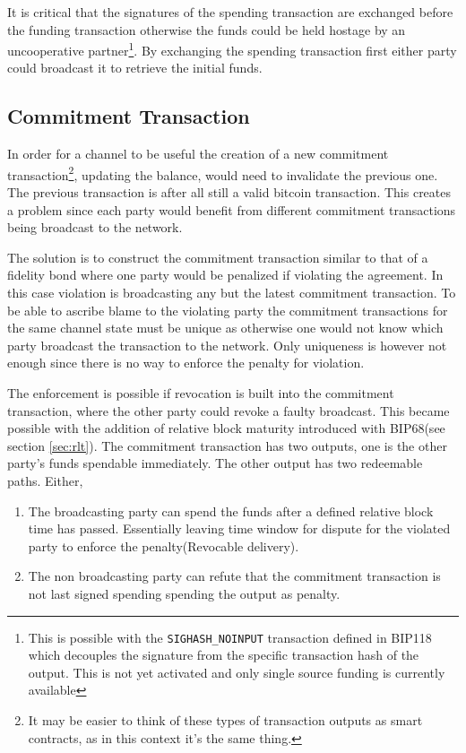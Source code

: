 It is critical that the signatures of the spending transaction are exchanged before the funding transaction otherwise the funds could be held hostage by an uncooperative partner\footnote{This is possible with the \texttt{SIGHASH\_NOINPUT} transaction defined in BIP118~\cite{bip:0118:sighash:noinput} which decouples the signature from the specific transaction \gls{hash} of the output. This is not yet activated and only single source funding is currently available}. By exchanging the spending transaction first either party could broadcast it to retrieve the initial funds.

\subsection{Commitment Transaction}

In order for a channel to be useful the creation of a new \gls{commitment transaction}\footnote{It may be easier to think of these types of transaction outputs as smart contracts, as in this context it's the same thing.}, updating the balance, would need to invalidate the previous one. The previous transaction is after all still a valid bitcoin transaction. This creates a problem since each party would benefit from different commitment transactions being broadcast to the network.

The solution is to construct the \gls{commitment transaction} similar to that of a fidelity bond where one party would be penalized if violating the agreement. In this case violation is broadcasting any but the latest commitment transaction. To be able to ascribe blame to the violating party the commitment transactions for the same channel state must be unique as otherwise one would not know which party broadcast the transaction to the network. Only uniqueness is however not enough since there is no way to enforce the penalty for violation.

The enforcement is possible if revocation is built into the commitment transaction, where the other party could revoke a faulty broadcast. This became possible with the addition of relative block maturity introduced with BIP68(see section \ref{sec:rlt}). The commitment transaction has two outputs, one is the other party's funds spendable immediately. The other output has two redeemable paths. Either,

\begin{enumerate}
	\item The broadcasting party can spend the funds after a defined relative block time has passed. Essentially leaving time window for dispute for the violated party to enforce the penalty(Revocable delivery).
	\item The non broadcasting party can refute that the commitment transaction is not last signed spending spending the output as penalty.
\end{enumerate}

